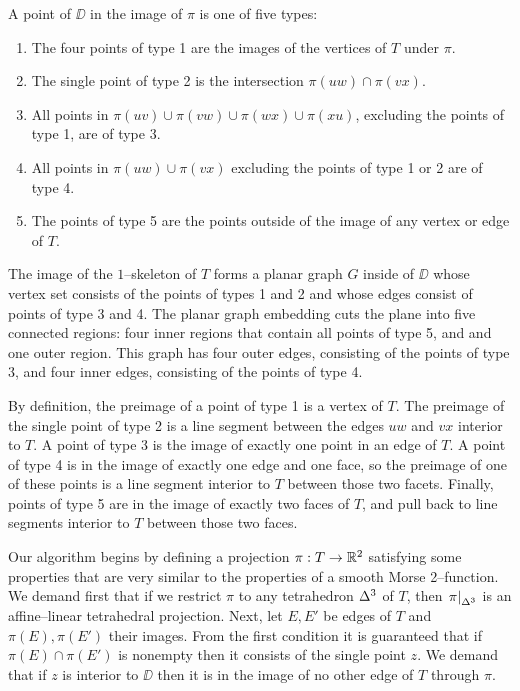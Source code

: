 \begin{defn}
\label{def:projpttypes}
A point of $\DD$ in the image of $\pi$ is one of five types:
\begin{enumerate}
  \item The four points of type 1 are the images of the vertices of $T$ under $\pi$.
  \item The single point of type 2 is the intersection $\pi(uw)\cap\pi(vx)$.
  \item All points in $\pi(uv)\cup\pi(vw)\cup\pi(wx)\cup\pi(xu)$, excluding the points of type 1, are of type 3.
  \item All points in $\pi(uw)\cup\pi(vx)$ excluding the points of type 1 or 2 are of type 4.
  \item The points of type 5 are the points outside of the image of any vertex or edge of $T$.
\end{enumerate}
The image of the $1$--skeleton of $T$ forms a planar graph $G$ inside of $\DD$ whose vertex set consists of the points of types 1 and 2 and whose edges consist of points of type 3 and 4.
The planar graph embedding cuts the plane into five connected regions: four inner regions that contain all points of type 5, and and one outer region.
This graph has four outer edges, consisting of the points of type 3, and four inner edges, consisting of the points of type 4.

By definition, the preimage of a point of type 1 is a vertex of $T$.
The preimage of the single point of type 2 is a line segment between the edges $uw$ and $vx$ interior to $T$.
A point of type 3 is the image of exactly one point in an edge of $T$.
A point of type 4 is in the image of exactly one edge and one face, so the preimage of one of these points is a line segment interior to $T$ between those two facets.
Finally, points of type 5 are in the image of exactly two faces of $T$, and pull back to line segments interior to $T$ between those two faces.
\end{defn}

Our algorithm begins by defining a projection $\pi:T\to\mathbb{R}^2$ satisfying some properties that are very similar to the properties of a smooth Morse 2--function.
We demand first that if we restrict $\pi$ to any tetrahedron $\Delta^3$ of $T$, then $\left.\pi\right|_{\Delta^3}$ is an affine--linear tetrahedral projection.
Next, let $E,E'$ be edges of $T$ and $\pi(E),\pi(E')$ their images.
From the first condition it is guaranteed that if $\pi(E)\cap\pi(E')$ is nonempty then it consists of the single point $z$.
We demand that if $z$ is interior to $\DD$ then it is in the image of no other edge of $T$ through $\pi$.

